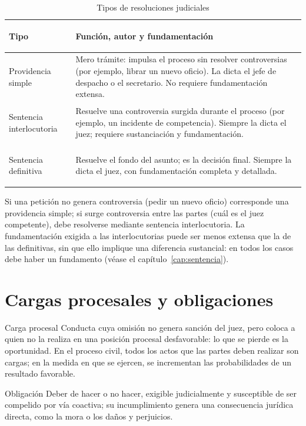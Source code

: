 \documentclass[12pt,oneside]{book}
\begin{document}
\begin{table}[H]
\centering
\caption{Tipos de resoluciones judiciales}
\begin{tabularx}{\textwidth}{>{\bfseries\raggedright\arraybackslash}p{} X}
\toprule
Tipo & Función, autor y fundamentación \\
\midrule
Providencia simple & Mero trámite: impulsa el proceso sin resolver controversias (por ejemplo, librar un nuevo oficio). La dicta el jefe de despacho o el secretario. No requiere fundamentación extensa. \\
Sentencia interlocutoria & Resuelve una controversia surgida durante el proceso (por ejemplo, un incidente de competencia). Siempre la dicta el juez; requiere sustanciación y fundamentación. \\
Sentencia definitiva & Resuelve el fondo del asunto; es la decisión final. Siempre la dicta el juez, con fundamentación completa y detallada. \\
\bottomrule
\end{tabularx}
\end{table}

Si una petición no genera controversia (pedir un nuevo oficio) corresponde una providencia simple; si surge controversia entre las partes (cuál es el juez competente), debe resolverse mediante sentencia interlocutoria. La fundamentación exigida a las interlocutorias puede ser menos extensa que la de las definitivas, sin que ello implique una diferencia sustancial: en todos los casos debe haber un fundamento (véase el capítulo~\ref{cap:sentencia}).

\section{Cargas procesales y obligaciones}

\begin{definicion}{Carga procesal}
Conducta cuya omisión no genera sanción del juez, pero coloca a quien no la realiza en una posición procesal desfavorable: lo que se pierde es la oportunidad. En el proceso civil, todos los actos que las partes deben realizar son cargas; en la medida en que se ejercen, se incrementan las probabilidades de un resultado favorable.
\end{definicion}

\begin{definicion}{Obligación}
Deber de hacer o no hacer, exigible judicialmente y susceptible de ser compelido por vía coactiva; su incumplimiento genera una consecuencia jurídica directa, como la mora o los daños y perjuicios.
\end{definicion}
\end{document}
